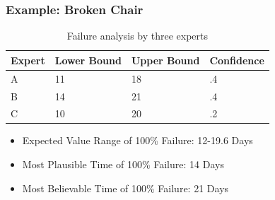 \documentclass{beamer}
\begin{document}
\begin{frame}
\frametitle{Example: Broken Chair}
\begin{table}
\begin{tabular}{l l l l}
\toprule
\textbf{Expert} & \textbf{Lower Bound} & \textbf{Upper Bound} & \textbf{Confidence}\\
\midrule
A & 11 & 18 & .4 \\
B & 14 & 21 & .4 \\
C & 10 & 20 & .2 \\
\bottomrule
\end{tabular}
\caption{Failure analysis by three experts}
\end{table}

\begin{itemize}
\pause\item{Expected Value Range of 100\% Failure: 12-19.6 Days}
\item{Most Plausible Time of 100\% Failure: 14 Days}
\item{Most Believable Time of 100\% Failure: 21 Days}
\end{itemize}
\end{frame}
\end{document}
